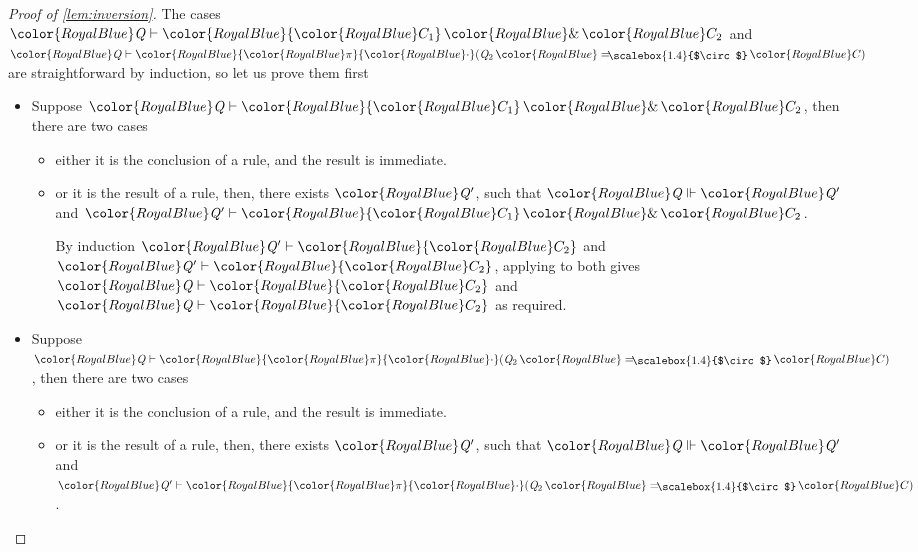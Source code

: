 \documentclass[acmsmall,usenames,dvipsnames,natbib=false,acmthm=false,screen]{acmart}
\newcommand{\constraintcolour}{\color{RoyalBlue}}
\newcommand{\constraintfont}[1]{{\constraintcolour#1}}
\newcommand{\multiplicitycolour}{\color{RoyalBlue}}
\newcommand{\multiplicityfont}[1]{{\multiplicitycolour#1}}
\newcommand{\scale}{\constraintfont{\cdot}}
\newcommand{\constraintop}[1]{\mathop{\constraintfont{#1}}}
\newcommand{\aand}{\constraintop{\&}}
\newcommand{\lollycirc}{\raisebox{-0.255ex}{\scalebox{1.4}{$\circ$}}}
\newcommand{\Lolly}{\constraintop{=\kern-1.1ex \lollycirc}}
\theoremstyle{acmplain}
\theoremstyle{acmdefinition}
\begin{document}
\begin{proof}[Proof of \cref{lem:inversion}]
  The cases $ \constraintfont{ \ottnt{Q} }   \vdash   \constraintfont{ \constraintfont{C_{{\mathrm{1}}}}  \aand  \constraintfont{C_{{\mathrm{2}}}} } $ and $ \constraintfont{ \ottnt{Q} }   \vdash   \constraintfont{   \multiplicityfont{ \pi }  \scale( \ottnt{Q_{{\mathrm{2}}}}  \Lolly  \constraintfont{C} )  } $ are
  straightforward by induction, so let us prove them first
  \begin{itemize}
  \item Suppose $ \constraintfont{ \ottnt{Q} }   \vdash   \constraintfont{ \constraintfont{C_{{\mathrm{1}}}}  \aand  \constraintfont{C_{{\mathrm{2}}}} } $, then there are two cases
    \begin{itemize}
    \item either it is the conclusion of a  rule,
      and the result is immediate.
    \item or it is the result of a  rule, then, there
      exists $  \constraintfont{ \ottnt{Q'} }  $, such that $ \constraintfont{ \ottnt{Q} }   \Vdash   \constraintfont{ \ottnt{Q'} } $ and
      $ \constraintfont{ \ottnt{Q'} }   \vdash   \constraintfont{ \constraintfont{C_{{\mathrm{1}}}}  \aand  \constraintfont{C_{{\mathrm{2}}}} } $.

      By induction $ \constraintfont{ \ottnt{Q'} }   \vdash   \constraintfont{ \constraintfont{C_{{\mathrm{2}}}} } $ and $ \constraintfont{ \ottnt{Q'} }   \vdash   \constraintfont{ \constraintfont{C_{{\mathrm{2}}}} } $, applying
       to both gives $ \constraintfont{ \ottnt{Q} }   \vdash   \constraintfont{ \constraintfont{C_{{\mathrm{2}}}} } $ and $ \constraintfont{ \ottnt{Q} }   \vdash   \constraintfont{ \constraintfont{C_{{\mathrm{2}}}} } $ as
      required.
    \end{itemize}

  \item Suppose $ \constraintfont{ \ottnt{Q} }   \vdash   \constraintfont{   \multiplicityfont{ \pi }  \scale( \ottnt{Q_{{\mathrm{2}}}}  \Lolly  \constraintfont{C} )  } $, then there are two cases
    \begin{itemize}
    \item either it is the conclusion of a  rule,
      and the result is immediate.
    \item or it is the result of a  rule, then, there
      exists $  \constraintfont{ \ottnt{Q'} }  $, such that $ \constraintfont{ \ottnt{Q} }   \Vdash   \constraintfont{ \ottnt{Q'} } $ and
      $ \constraintfont{ \ottnt{Q'} }   \vdash   \constraintfont{   \multiplicityfont{ \pi }  \scale( \ottnt{Q_{{\mathrm{2}}}}  \Lolly  \constraintfont{C} )  } $.


\end{itemize}
\end{itemize}
\end{proof}
\end{document}
